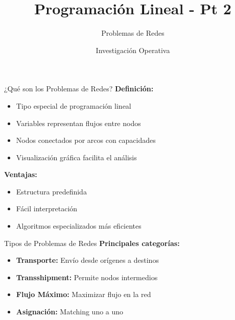 \documentclass{beamer}
\title{\Huge\textbf{Programación Lineal - Pt 2}}
\subtitle{Problemas de Redes}
\author{Investigación Operativa}
\date{}
\begin{document}
\begin{frame}
    \titlepage
\end{frame}

\begin{frame}{¿Qué son los Problemas de Redes?}
    \textbf{Definición:}
    \begin{itemize}
        \item Tipo especial de programación lineal
        \item Variables representan flujos entre nodos
        \item Nodos conectados por arcos con capacidades
        \item Visualización gráfica facilita el análisis
    \end{itemize}
    
    \vspace{1em}
    \textbf{Ventajas:}
    \begin{itemize}
        \item Estructura predefinida
        \item Fácil interpretación
        \item Algoritmos especializados más eficientes
    \end{itemize}
\end{frame}

\begin{frame}{Tipos de Problemas de Redes}
    \textbf{Principales categorías:}
    \begin{itemize}
        \item[{\makebox[1em][c]{\textcolor{black}{\faTruck}}}] \textbf{Transporte:} Envío desde orígenes a destinos
        \item[{\makebox[1em][c]{\textcolor{black}{\faTrain}}}] \textbf{Transshipment:} Permite nodos intermedios
        \item[{\makebox[1em][c]{\textcolor{black}{\faTint}}}] \textbf{Flujo Máximo:} Maximizar flujo en la red
        \item[{\makebox[1em][c]{\textcolor{black}{\faRoute}}}] \textbf{Asignación:} Matching uno a uno
    \end{itemize}
\end{frame}
\end{document}
